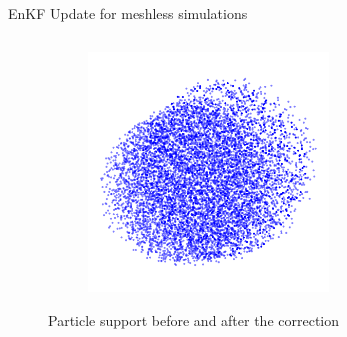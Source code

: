 \documentclass[aspectratio=169]{beamer} %
\begin{document}
\begin{frame}{EnKF Update for meshless simulations}
\begin{columns}[t]
\begin{column}{0.3\textwidth}
\begin{figure}
\begin{subfigure}{\textwidth}
                \end{subfigure}
                \begin{subfigure}{\textwidth}
                    \centering
                    \includegraphics[width=0.7\textwidth]{../../conference/images/all_particles.pdf}
                \end{subfigure}
                \caption*{Particle support before and after the correction}
            \end{figure}
        \end{column}
    \end{columns}
\end{frame}
\end{document}
